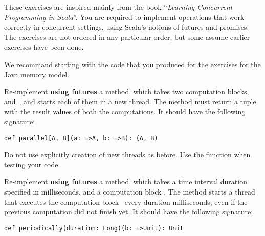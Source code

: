 \documentclass[11pt]{article}
\begin{document}
\myHeader

These exercises are inspired mainly from the book ``\emph{Learning Concurrent Programming in Scala}''.
%
You are required to implement operations that work correctly in concurrent settings, using Scala's notions of futures and promises.
The exercises are not ordered in any particular order, but some assume earlier exercises have been done.

We recommand starting with the code that you produced for the exercises for the Java memory model.



\begin{myExercise}Re-implement \textbf{using futures} a  method, which takes two computation blocks,~ and~, and starts each of them in a new thread. The method must return a tuple with the result values of both the computations. It should have the following signature:
\begin{lstlisting}
def parallel[A, B](a: =>A, b: =>B): (A, B)
\end{lstlisting}
Do not use explicitly creation of new threads as before. Use the  function when testing your code.
\end{myExercise}

\begin{myExercise}Re-implement \textbf{using futures} a  method, which takes a time interval duration specified in milliseconds, and a computation block . The method starts a thread that executes the computation block~ every duration milliseconds, even if the previous computation did not finish yet. It should have the following signature:
\begin{lstlisting}
def periodically(duration: Long)(b: =>Unit): Unit
\end{lstlisting}
\end{myExercise}
\end{document}
